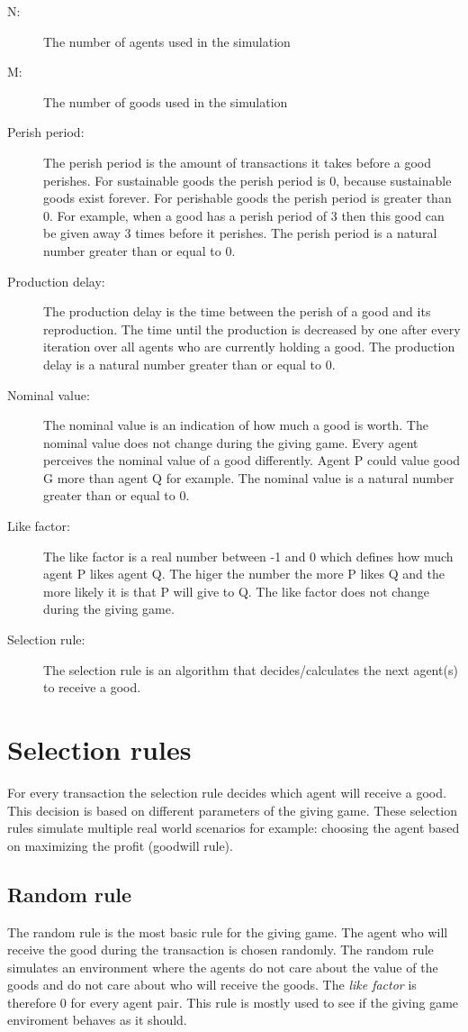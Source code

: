\documentclass[twoside,openright]{uva-bachelor-thesis}
\begin{document}
\begin{description}
  \item[N:] The number of agents used in the simulation
  \item[M:] The number of goods used in the simulation
  \item[Perish period:] The perish period is the amount of transactions it takes before a good perishes. For sustainable goods the perish period is 0, because sustainable goods exist forever. For perishable goods the perish period is greater than 0. For example, when a good has a perish period of 3 then this good can be given away 3 times before it perishes. The perish period is a natural number greater than or equal to 0.
  \item[Production delay:] The production delay is the time between the perish of a good and its reproduction. The time until the production is decreased by one after every iteration over all agents who are currently holding a good. The production delay is a natural number greater than or equal to 0.
  \item[Nominal value:] The nominal value is an indication of how much a good is worth. The nominal value does not change during the giving game. Every agent perceives the nominal value of a good differently. Agent P could value good G more than agent Q for example. The nominal value is a natural number greater than or equal to 0.
  \item[Like factor:] The like factor is a real number between -1 and 0 which defines how much agent P likes agent Q. The higer the number the more P likes Q and the more likely it is that P will give to Q. The like factor does not change during the giving game. 
  \item[Selection rule:] The selection rule is an algorithm that decides/calculates the next agent(s) to receive a good.

\end{description}

\section{Selection rules}
For every transaction the selection rule decides which agent will receive a good. This decision is based on different parameters of the giving game. These selection rules simulate multiple real world scenarios for example: choosing the agent based on maximizing the profit (goodwill rule).

\subsection{Random rule}
The random rule is the most basic rule for the giving game. The agent who will receive the good during the transaction is chosen randomly. The random rule simulates an environment where the agents do not care about the value of the goods and do not care about who will receive the goods. The \textit{like factor} is therefore 0 for every agent pair. This rule is mostly used to see if the giving game enviroment behaves as it should.
\end{document}
